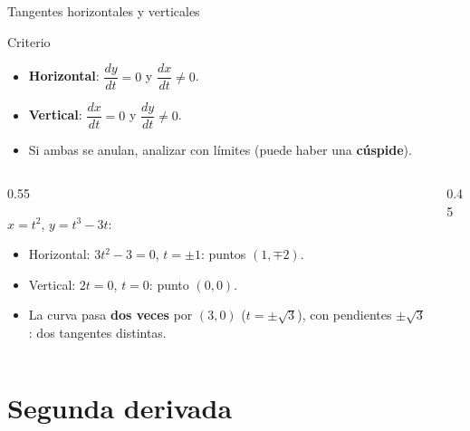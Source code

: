 \documentclass[10pt,aspectratio=169]{beamer}
\begin{document}
\begin{frame}{Tangentes horizontales y verticales}
  \small
  \begin{block}{Criterio}
    \begin{itemize}
      \item \textbf{Horizontal}: $\dfrac{dy}{dt}=0$ y $\dfrac{dx}{dt}\neq0$.
      \item \textbf{Vertical}: $\dfrac{dx}{dt}=0$ y $\dfrac{dy}{dt}\neq0$.
      \item Si ambas se anulan, analizar con límites (puede haber una \textbf{cúspide}).
    \end{itemize}
  \end{block}
  \begin{columns}
    \begin{column}{0.55\textwidth}
      \begin{ejemplo}[8]
        $x=t^2$, $y=t^3-3t$:
        \begin{itemize}
          \item Horizontal: $3t^2-3=0$, $t=\pm1$: puntos $(1,\mp2)$.
          \item Vertical: $2t=0$, $t=0$: punto $(0,0)$.
          \item La curva pasa \textbf{dos veces} por $(3,0)$ ($t=\pm\sqrt3$), con pendientes $\pm\sqrt3$: dos tangentes distintas.
        \end{itemize}
      \end{ejemplo}
    \end{column}
    \begin{column}{0.45\textwidth}
      \centering
    \end{column}
  \end{columns}
\end{frame}

\section{Segunda derivada}
\end{document}

